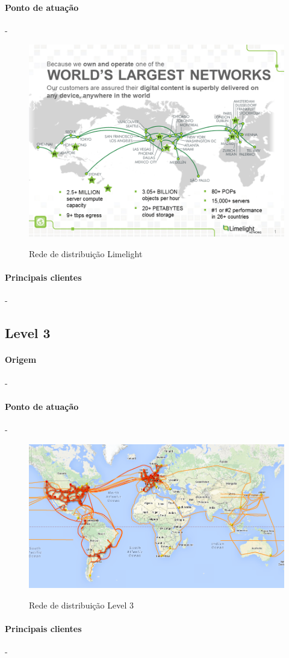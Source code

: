 \paragraph{Ponto de atua\c{c}\~ao}-
\begin{figure}[H]
\caption{Rede de distribui\c{c}\~ao Limelight}
\includegraphics[width=15cm]{Figuras/limelight_map.png} 
\label{figura:limelight_map}
\end{figure}
\paragraph{Principais clientes}-
\subsection{Level 3}
\paragraph{Origem}- 
\paragraph{Ponto de atua\c{c}\~ao}-
\begin{figure}[H]
\caption{Rede de distribui\c{c}\~ao Level 3}
\includegraphics[width=15cm]{Figuras/level3_map.png} 
\label{figura:level3_map}
\end{figure}
\paragraph{Principais clientes}-